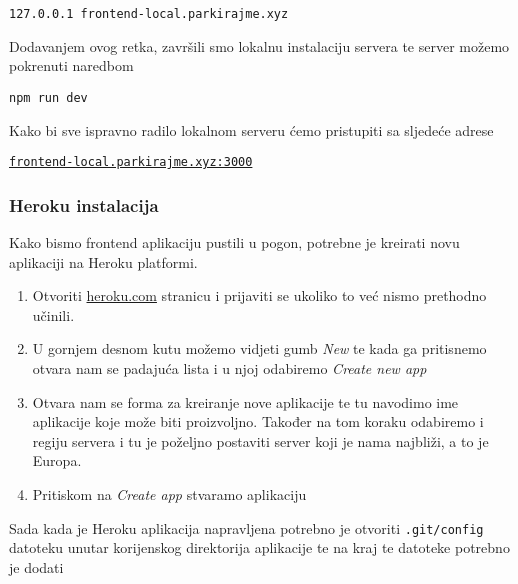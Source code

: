 								\begin{center}
										\texttt{127.0.0.1	frontend-local.parkirajme.xyz}
								\end{center}
								
								Dodavanjem ovog retka, završili smo lokalnu instalaciju servera te server možemo pokrenuti naredbom
								
								\begin{center}
										\texttt{npm run dev}
								\end{center}
								
								Kako bi sve ispravno radilo lokalnom serveru ćemo pristupiti sa sljedeće adrese

								\begin{center}
										\href{http://frontend-local.parkirajme.xyz:3000/}{\texttt{frontend-local.parkirajme.xyz:3000}}
								\end{center}
		             
						\pagebreak
		    
						\subsubsection*{Heroku instalacija}
	        
								Kako bismo frontend aplikaciju pustili u pogon, potrebne je kreirati novu aplikaciji na Heroku platformi.
								
								\begin{enumerate}
									\item Otvoriti \href{https://dashboard.heroku.com/apps}{heroku.com} stranicu i prijaviti se ukoliko to već nismo prethodno učinili.
									\item U gornjem desnom kutu možemo vidjeti gumb \textit{New} te kada ga pritisnemo otvara nam se padajuća lista i u njoj odabiremo \textit{Create new app}
									\item Otvara nam se forma za kreiranje nove aplikacije te tu navodimo ime aplikacije koje može biti proizvoljno. Također na tom koraku odabiremo i regiju servera i tu je poželjno postaviti server koji je nama najbliži, a to je Europa.
									\item Pritiskom na \textit{Create app} stvaramo aplikaciju
		        		\end{enumerate}
		        
		        		Sada kada je Heroku aplikacija napravljena potrebno je otvoriti \texttt{.git/config} datoteku unutar korijenskog direktorija aplikacije te na kraj te datoteke potrebno je dodati

